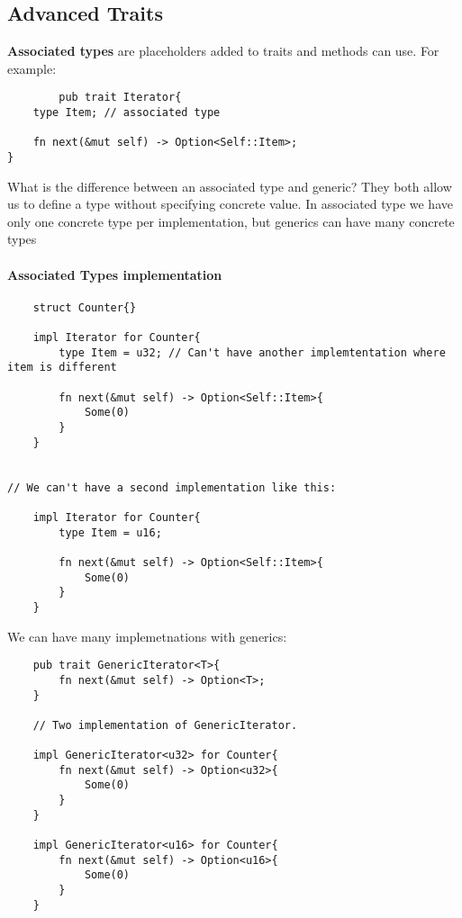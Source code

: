 \subsection{Advanced Traits}
\begin{definition}
    \textbf{Associated types} are placeholders added to traits and methods can use. For example:\begin{lstlisting}
        pub trait Iterator{
    type Item; // associated type

    fn next(&mut self) -> Option<Self::Item>;
}
    \end{lstlisting}
    What is the difference between an associated type and generic? They both allow us to define a type without specifying concrete value. In associated type we have only one concrete type per implementation, but generics can have many concrete types

    \paragraph*{Associated Types implementation}\begin{lstlisting}
    struct Counter{}

    impl Iterator for Counter{
        type Item = u32; // Can't have another implemtentation where item is different 

        fn next(&mut self) -> Option<Self::Item>{
            Some(0)
        }
    }


// We can't have a second implementation like this:

    impl Iterator for Counter{
        type Item = u16; 

        fn next(&mut self) -> Option<Self::Item>{
            Some(0)
        }
    }
    \end{lstlisting}

    We can have many implemetnations with generics:\begin{lstlisting}
    pub trait GenericIterator<T>{
        fn next(&mut self) -> Option<T>;
    }

    // Two implementation of GenericIterator.

    impl GenericIterator<u32> for Counter{ 
        fn next(&mut self) -> Option<u32>{
            Some(0)
        }
    }

    impl GenericIterator<u16> for Counter{ 
        fn next(&mut self) -> Option<u16>{
            Some(0)
        }
    }
    \end{lstlisting}
\end{definition}

